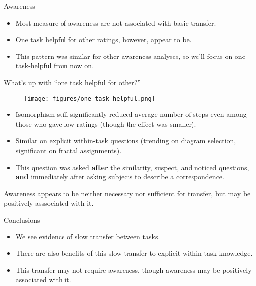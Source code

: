 \documentclass{beamer}
\begin{document}

\begin{frame}{Awareness}
\begin{itemize}
\item Most measure of awareness are not associated with basic transfer.
\item<2-> One task helpful for other ratings, however, appear to be.
\item<3-> This pattern was similar for other awareness analyses, so we'll focus on one-task-helpful from now on.
\end{itemize}
\end{frame}




\begin{frame}{What's up with ``one task helpful for other?''}
\begin{figure}
\centering
\texttt{[image: figures/one\_task\_helpful.png]}
\end{figure}
\vspace{-1em}
\begin{itemize}
\item<2-> Isomorphism still significantly reduced average number of steps even among those who gave low ratings (though the effect was smaller).
\item<3-> Similar on explicit within-task questions (trending on diagram selection, significant on fractal assignments). 
\item<4-> This question was asked \textbf{after} the similarity, suspect, and noticed questions, \textbf{and} immediately after asking subjects to describe a correspondence.
\end{itemize}
\end{frame}

\begin{frame}[standout]
Awareness appears to be neither necessary nor sufficient for transfer, but may be positively asssociated with it. 
\end{frame}


\begin{frame}{Conclusions}
\begin{itemize}
\item We see evidence of slow transfer between tasks.
\item<2-> There are also benefits of this slow transfer to explicit within-task knowledge. 
\item<3-> This transfer may not require awareness, though awareness may be positively associated with it. 
\end{itemize}
\end{frame}
\end{document}
